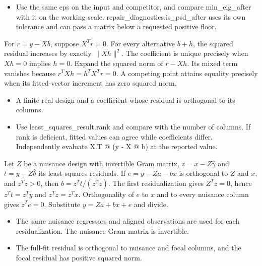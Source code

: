 \expandafter\def\csname statadic@diagnostics@STATADIC-PSD-003\endcsname{\begin{itemize}
\item Use the same eps on the input and competitor, and compare min\_eig\_after with it on the working scale. repair\_diagnostics.is\_psd\_after uses its own tolerance and can pass a matrix below a requested positive floor.
\end{itemize}}
\expandafter\def\csname statadic@statement@STATADIC-LSTSQ-001\endcsname{For $r=y-Xb$, suppose $X^Tr=0$. For every alternative
  $b+h$, the squared residual increases by exactly $\|Xh\|^2$.
  The coefficient is unique precisely when $Xh=0$ implies $h=0$.}
\expandafter\def\csname statadic@proof@STATADIC-LSTSQ-001\endcsname{Expand the squared norm of $r-Xh$. Its mixed term vanishes
  because $r^TXh=h^TX^Tr=0$. A competing point attains equality precisely
  when its fitted-vector increment has zero squared norm.}
\expandafter\def\csname statadic@assumptions@STATADIC-LSTSQ-001\endcsname{\begin{itemize}
\item A finite real design and a coefficient whose residual is orthogonal to its columns.
\end{itemize}}
\expandafter\def\csname statadic@diagnostics@STATADIC-LSTSQ-001\endcsname{\begin{itemize}
\item Use least\_squares\_result.rank and compare with the number of columns. If rank is deficient, fitted values can agree while coefficients differ. Independently evaluate X.T @ (y - X @ b) at the reported value.
\end{itemize}}
\expandafter\def\csname statadic@statement@STATADIC-FWL-001\endcsname{Let $Z$ be a nuisance design with invertible Gram matrix,
  $z=x-Z\hat\gamma$ and $t=y-Z\hat\delta$ its least-squares residuals.
  If $e=y-Za-bx$ is orthogonal to $Z$ and $x$, and $z^Tz>0$, then
  $b=z^Tt/(z^Tz)$.}
\expandafter\def\csname statadic@proof@STATADIC-FWL-001\endcsname{The first residualization gives $Z^Tz=0$, hence
  $z^Tt=z^Ty$ and $z^Tz=z^Tx$. Orthogonality of $e$ to $x$ and to
  every nuisance column gives $z^Te=0$. Substitute $y=Za+bx+e$ and divide.}
\expandafter\def\csname statadic@assumptions@STATADIC-FWL-001\endcsname{\begin{itemize}
\item The same nuisance regressors and aligned observations are used for each residualization. The nuisance Gram matrix is invertible.
\item The full-fit residual is orthogonal to nuisance and focal columns, and the focal residual has positive squared norm.
\end{itemize}}
